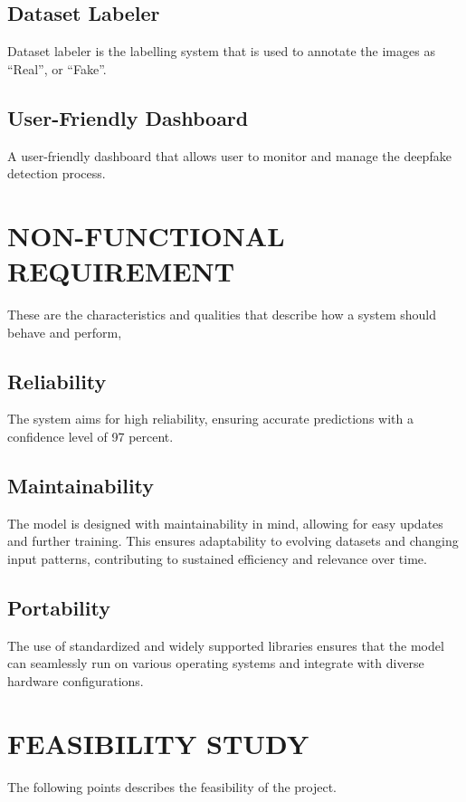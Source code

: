             \subsection{Dataset Labeler}
                Dataset labeler is the labelling system that is used to annotate the images as “Real”, or “Fake”.

            \subsection{User-Friendly Dashboard}
                A user-friendly dashboard that allows user to monitor and manage the deepfake detection process.

        \section{NON-FUNCTIONAL REQUIREMENT}
            These are the characteristics and qualities that describe how a system should behave and perform,

            \subsection{Reliability}
                The system aims for high reliability, ensuring accurate predictions with a confidence level of 97 percent.
            \subsection{Maintainability}
                The model is designed with maintainability in mind, allowing for easy updates and further training. This ensures adaptability to evolving datasets and changing input patterns, contributing to sustained efficiency and relevance over time.
            \subsection{Portability}
                The use of standardized and widely supported libraries ensures that the model can seamlessly run on various operating systems and integrate with diverse hardware configurations.
            
        \section{FEASIBILITY STUDY}
            The following points describes the feasibility of the project.

